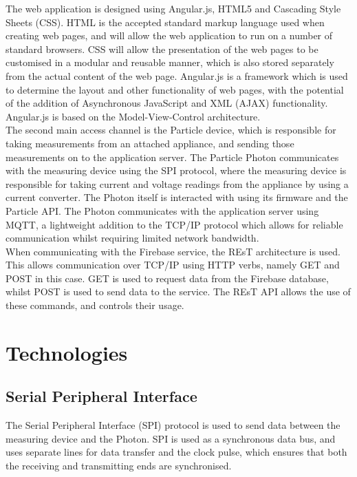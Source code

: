 \documentclass{article}
\begin{document}
	The web application is designed using Angular.js, HTML5 and Cascading 
	Style Sheets (CSS). HTML is the accepted standard markup language 
	used when creating web pages, and will allow the web application to 
	run on a number of standard browsers. CSS will allow the presentation 
	of the web pages to be customised in a modular and reusable manner, 
	which is also stored separately from the actual content of the web 
	page. Angular.js is a framework which is used to determine the layout 
	and other functionality of web pages, with the potential of the 
	addition of Asynchronous JavaScript and XML (AJAX) functionality. 
	Angular.js is based on the Model-View-Control architecture.\\
	
	The second main access channel is the Particle device, which is 
	responsible for taking measurements from an attached appliance, and 
	sending those measurements on to the application server. The Particle 
	Photon communicates with the measuring device using the SPI protocol, 
	where the measuring device is responsible for taking current and 
	voltage readings from the appliance by using a current converter. The 
	Photon itself is interacted with using its firmware and the Particle 
	API. The Photon communicates with the application server using MQTT, 
	a lightweight addition to the TCP/IP protocol which allows for 
	reliable communication whilst requiring limited network bandwidth.\\
	
	When communicating with the Firebase service, the REsT architecture 
	is used. This allows communication over TCP/IP using HTTP verbs, 
	namely GET and POST in this case. GET is used to request data from 
	the Firebase database, whilst POST is used to send data to the 
	service. The REsT API allows the use of these commands, and controls 
	their usage.

\newpage

\section{Technologies}

	\subsection{Serial Peripheral Interface}
	
	The Serial Peripheral Interface (SPI) protocol is used to send data 
	between the measuring device and the Photon. SPI is used as a 
	synchronous data bus, and uses separate lines for data transfer and 
	the clock pulse, which ensures that both the receiving and 
	transmitting ends are synchronised.\\
	
\end{document}
